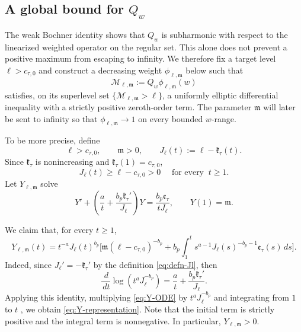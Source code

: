 \documentclass[reqno,12pt]{amsart}
\numberwithin{equation}{section}
\theoremstyle{remark}
\newcommand{\dd}{\,d}
\begin{document}
\subsection{A global bound for \texorpdfstring{$Q_w$}{Qw}}
The weak Bochner identity shows that $Q_w$ is subharmonic with
respect to the linearized weighted operator on the regular set. This alone does not prevent a positive maximum from escaping to infinity.  We therefore fix a target level
$\ell>c_{\tau,0}$ and construct a decreasing weight
$\phi_{\ell,\mathfrak m}$ below such that
$$
\mathscr M_{\ell,\mathfrak m}:=Q_w\phi_{\ell,\mathfrak m}(w)
$$
satisfies, on its superlevel set
$\{\mathscr M_{\ell,\mathfrak m}>\ell\}$, a uniformly elliptic
differential inequality with a strictly positive zeroth-order
term.  The parameter $\mathfrak m$ will later be sent to infinity so that $\phi_{\ell,\mathfrak m}\to 1$ on every bounded $w$-range.

To be more precise, define
\begin{equation}\label{eq:defn-Jl}
\ell>c_{\tau,0}, \qquad
\mathfrak m>0, \qquad J_\ell(t):=\ell-\mathfrak k_\tau(t).
\end{equation}
Since $\mathfrak k_\tau$ is nonincreasing and
$\mathfrak k_\tau(1)=c_{\tau,0}$,
$$
J_\ell(t)\ge\ell-c_{\tau,0}>0
\quad \text{ for every } \ t\ge 1.
$$
Let $Y_{\ell,\mathfrak m}$ solve
\begin{equation}\label{eq:Y-ODE}
 Y' +\left(\frac a t+\frac{b_p \mathfrak k_\tau'}{J_\ell}\right)Y  =\frac{b_p\mathfrak e_\tau}{tJ_\ell},
 \qquad  Y(1)=\mathfrak m.
\end{equation}

We claim that, for every $t\ge1$,
\begin{equation}\label{eq:Y-representation}
 Y_{\ell,\mathfrak m}(t) = t^{-a}J_\ell(t)^{b_p}
 \Bigg[ \mathfrak m(\ell-c_{\tau,0})^{-b_p} +b_p\int_1^t
 s^{a-1}J_\ell(s)^{-b_p-1}\mathfrak e_\tau(s)\dd s \Bigg].
\end{equation}
Indeed,  since $J_\ell'=-\mathfrak k_\tau'$ by the definition \eqref{eq:defn-Jl}, then
$$
 \frac{\dd}{\dd t}\log(t^aJ_\ell^{-b_p})
 =\frac at+\frac{b_p\mathfrak k_\tau'}{J_\ell}.
$$
Applying this identity, multiplying \eqref{eq:Y-ODE} by $t^aJ_\ell^{-b_p}$ and integrating from $1$ to $t$ , we obtain  \eqref{eq:Y-representation}.  Note that the initial term is strictly positive and the integral term is nonnegative. In particular, $Y_{\ell,\mathfrak m}>0$.
 
\end{document}
